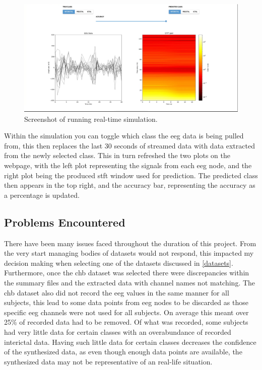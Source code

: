 \documentclass[12pt]{article}
\begin{document}
\begin{figure}[H]
\includegraphics[width=\textwidth]{real-time}
\centering
\caption{Screenshot of running real-time simulation.}
\label{fig:real-time}
\end{figure}

Within the simulation you can toggle which class the \acrshort{eeg} data is being pulled from, this then replaces the last 30 seconds of streamed data with data extracted from the newly selected class. This in turn refreshed the two plots on the webpage, with the left plot representing the signals from each \acrshort{eeg} node, and the right plot being the produced \acrshort{stft} window used for prediction. The predicted class then appears in the top right, and the accuracy bar, representing the accuracy as a percentage is updated. 



\subsection{Problems Encountered}\label{issues}


There have been many issues faced throughout the duration of this project. From the very start managing bodies of datasets would not respond, this impacted my decision making when selecting one of the datasets discussed in \ref{datasets}. Furthermore, once the \acrshort{chb} dataset was selected there were discrepancies within the summary files and the extracted data with channel names not matching. The \acrshort{chb} dataset also did not record the \acrshort{eeg} values in the same manner for all subjects, this lead to some data points from \acrshort{eeg} nodes to be discarded as those specific \acrshort{eeg} channels were not used for all subjects. On average this meant over 25\% of recorded data had to be removed. Of what was recorded, some subjects had very little data for certain classes with an overabundance of recorded interictal data. Having such little data for certain classes decreases the confidence of the synthesized data, as even though enough data points are available, the synthesized data may not be representative of an real-life situation. 
\end{document}
